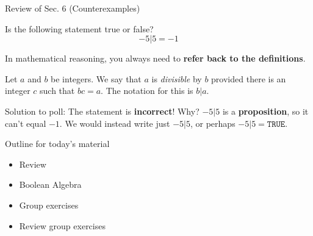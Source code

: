 \documentclass[10pt]{beamer}
\begin{document}
\begin{frame}{Review of Sec. 6 (Counterexamples)}

\begin{myyellowbox}[title=Poll]
Is the following statement true or false? 
\[ -5|5 = -1 \] 
\end{myyellowbox}

\pause 

\begin{myredbox}[title=Alert!]
In mathematical reasoning, you always need to \textbf{refer back to the definitions}.    
\end{myredbox}

\pause 
	\begin{mydef}[title=Reminder of Definition 3.2 (\textbf{Divisible})]
	Let $a$ and $b$ be integers.  We say that $a$ is \textit{divisible} by $b$ provided there is an integer $c$ such that $bc=a$. The notation for this is $b|a$. 
	\end{mydef}
\pause 
\footnotesize 
Solution to poll: The statement is \textbf{incorrect}! Why? \pause $-5|5$ is a \textbf{proposition}, so it can't equal $-1$. We would instead write just $-5|5$, or perhaps $-5|5 = \texttt{TRUE}$. %
\end{frame}










\begin{frame}[standout]
Outline for today's material
\begin{itemize}
\item \textbullet \quad Review
\item \textbullet \quad \alert{Boolean Algebra}
\item \textbullet \quad Group exercises
\item \textbullet \quad Review group exercises
\end{itemize}

\end{frame}
\end{document}
